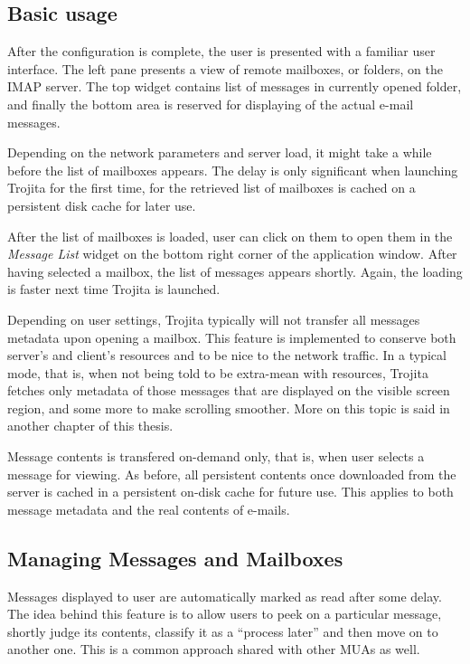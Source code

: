 \documentclass[12pt,notitlepage]{report}
\newcommand{\trojita}{Trojita\xspace}
\begin{document}
\subsection{Basic usage}

After the configuration is complete, the user is presented with a familiar user
interface. The left pane presents a view of remote mailboxes, or folders, on the
IMAP server. The top widget contains list of messages in currently opened
folder, and finally the bottom area is reserved for displaying of the actual
e-mail messages.

Depending on the network parameters and server load, it might take a while
before the list of mailboxes appears. The delay is only significant when
launching \trojita for the first time, for the retrieved list of mailboxes is
cached on a persistent disk cache for later use.

After the list of mailboxes is loaded, user can click on them to open them in
the {\em Message List} widget on the bottom right corner of the application
window.  After having selected a mailbox, the list of messages appears shortly.
Again, the loading is faster next time \trojita is launched.

Depending on user settings, \trojita typically will not transfer all messages
metadata upon opening a mailbox.  This feature is implemented to conserve
both server's and client's resources and to be nice to the network traffic.  In
a typical mode, that is, when not being told to be extra-mean with resources,
\trojita fetches only metadata of those messages that are displayed on the
visible screen region, and some more to make scrolling smoother.  More on this
topic is said in another chapter of this thesis.

Message contents is transfered on-demand only, that is, when user selects a
message for viewing.  As before, all persistent contents once downloaded from
the server is cached in a persistent on-disk cache for future use.  This applies
to both message metadata and the real contents of e-mails.

\subsection{Managing Messages and Mailboxes}

Messages displayed to user are automatically marked as read after some delay.
The idea behind this feature is to allow users to peek on a particular message,
shortly judge its contents, classify it as a ``process later'' and then move on
to another one.  This is a common approach shared with other MUAs as well.
\end{document}
